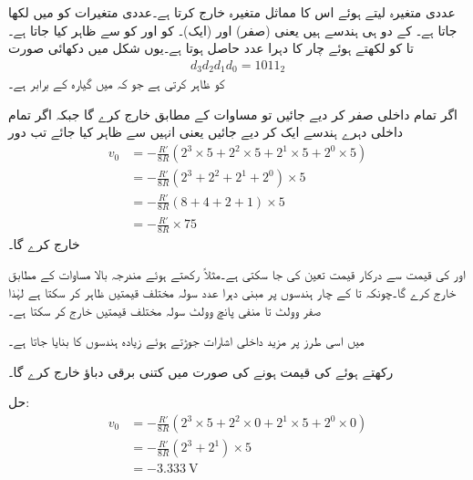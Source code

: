  عددی متغیرہ لیتے ہوئے اس کا مماثل متغیرہ خارج کرتا ہے۔عددی متغیرات کو   میں لکھا جاتا ہے۔ کے دو ہی ہندسے ہیں یعنی  (صفر) اور  (ایک)۔ کو  اور  کو  سے ظاہر کیا جاتا ہے۔ تا  کو  لکھتے ہوئے چار  کا دہرا عدد حاصل ہوتا ہے۔یوں شکل میں دکھائی صورت
\begin{align*}
d_3 d_2 d_1 d_0 =1011_2
\end{align*}
کو ظاہر کرتی ہے جو کہ  میں  گیارہ  کے برابر ہے۔

اگر تمام داخلی  صفر کر دیے جائیں تو  مساوات  کے مطابق   خارج کرے گا جبکہ اگر تمام داخلی دہرے ہندسے ایک کر دیے جائیں یعنی انہیں  سے ظاہر کیا جائے تب دور
\begin{align*}
v_0&=-\frac{R'}{8 R} \left(2^3 \times 5+2^2 \times 5+2^1 \times 5+2^0 \times 5 \right)\\
&=-\frac{R'}{8 R} \left(2^3+2^2 +2^1 +2^0  \right) \times 5\\
&=-\frac{R'}{8 R} \left(8+4 +2 +1 \right) \times 5\\
&=-\frac{R'}{8 R}\times 75
\end{align*}  
خارج کرے گا۔

 اور  کی قیمت سے درکار قیمت تعین کی جا سکتی ہے۔مثلاً  رکھتے ہوئے مندرجہ بالا مساوات کے مطابق   خارج کرے گا۔چونکہ  تا  کے چار ہندسوں پر مبنی دہرا عدد سولہ  مختلف قیمتیں ظاہر کر سکتا ہے لہٰذا  صفر وولٹ تا منفی پانچ وولٹ سولہ مختلف قیمتیں خارج کر سکتا ہے۔

 میں اسی طرز پر مزید داخلی اشارات  جوڑتے ہوئے زیادہ ہندسوں کا  بنایا جاتا ہے۔ 

 رکھتے ہوئے  کی قیمت  ہونے کی صورت میں  کتنی برقی دباؤ خارج کرے گا۔

حل:
\begin{align*}
v_0&=-\frac{R'}{8 R} \left(2^3 \times 5+2^2 \times 0+2^1 \times 5+2^0 \times 0 \right)\\
&=-\frac{R'}{8 R} \left(2^3+2^1  \right) \times 5\\
&=\SI{-3.333}{\volt}
\end{align*}  

